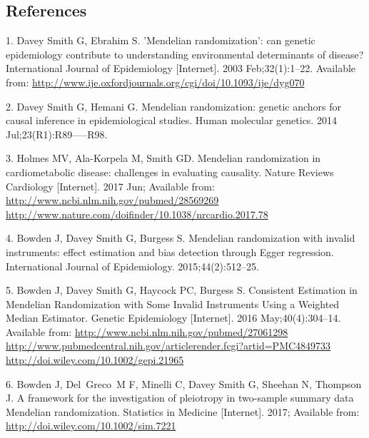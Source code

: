 \documentclass[]{article}
\begin{document}
\subsection{References}\label{references}

\raggedright

\hypertarget{refs}{}
\hypertarget{ref-DaveySmith2003}{}
1. Davey Smith G, Ebrahim S. 'Mendelian randomization': can genetic
epidemiology contribute to understanding environmental determinants of
disease? International Journal of Epidemiology {[}Internet{]}. 2003
Feb;32(1):1--22. Available from:
\url{http://www.ije.oxfordjournals.org/cgi/doi/10.1093/ije/dyg070}

\hypertarget{ref-DaveySmithHemani2014}{}
2. Davey Smith G, Hemani G. Mendelian randomization: genetic anchors for
causal inference in epidemiological studies. Human molecular genetics.
2014 Jul;23(R1):R89-----R98.

\hypertarget{ref-Holmes2017}{}
3. Holmes MV, Ala-Korpela M, Smith GD. Mendelian randomization in
cardiometabolic disease: challenges in evaluating causality. Nature
Reviews Cardiology {[}Internet{]}. 2017 Jun; Available from:
\href{http://www.ncbi.nlm.nih.gov/pubmed/28569269\%20http://www.nature.com/doifinder/10.1038/nrcardio.2017.78}{http://www.ncbi.nlm.nih.gov/pubmed/28569269 http://www.nature.com/doifinder/10.1038/nrcardio.2017.78}

\hypertarget{ref-Bowden2015}{}
4. Bowden J, Davey Smith G, Burgess S. Mendelian randomization with
invalid instruments: effect estimation and bias detection through Egger
regression. International Journal of Epidemiology. 2015;44(2):512--25.

\hypertarget{ref-Bowden2016b}{}
5. Bowden J, Davey Smith G, Haycock PC, Burgess S. Consistent Estimation
in Mendelian Randomization with Some Invalid Instruments Using a
Weighted Median Estimator. Genetic Epidemiology {[}Internet{]}. 2016
May;40(4):304--14. Available from:
\href{http://www.ncbi.nlm.nih.gov/pubmed/27061298\%20http://www.pubmedcentral.nih.gov/articlerender.fcgi?artid=PMC4849733\%20http://doi.wiley.com/10.1002/gepi.21965}{http://www.ncbi.nlm.nih.gov/pubmed/27061298 http://www.pubmedcentral.nih.gov/articlerender.fcgi?artid=PMC4849733 http://doi.wiley.com/10.1002/gepi.21965}

\hypertarget{ref-Bowden2017}{}
6. Bowden J, Del~Greco~M F, Minelli C, Davey Smith G, Sheehan N,
Thompson J. A framework for the investigation of pleiotropy in
two-sample summary data Mendelian randomization. Statistics in Medicine
{[}Internet{]}. 2017; Available from:
\url{http://doi.wiley.com/10.1002/sim.7221}
\end{document}

